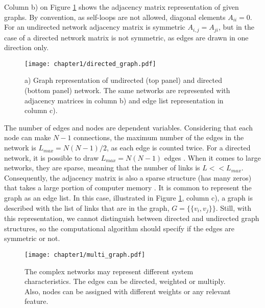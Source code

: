 Column b) on Figure \ref{fig:graph_dir} shows the adjacency matrix representation of given graphs. By convention, as self-loops are not allowed, diagonal elements $A_{ii}=0$. For an undirected network adjacency matrix is symmetric $A_{i,j}=A_{ji}$, but in the case of a directed network matrix is not symmetric, as edges are drawn in one direction only.  

\begin{figure}[h]
	\centering
	\texttt{[image: chapter1/directed\_graph.pdf]} 
	\caption[Graph, matrix and edge list representations.]{a) Graph representation of undirected (top panel) and directed (bottom panel) network. The same networks are represented with adjacency matrices in column b) and edge list representation in column c).}
	\label{fig:graph_dir}
\end{figure}

The number of edges and nodes are dependent variables. Considering that each node can make $N-1$ connections, the maximum number of the edges in the network is $L_{max}=N(N-1)/2$, as each edge is counted twice. For a directed network, it is possible to draw $L_{max}=N(N-1)$ edges \cite{caldarelli2007scalefree}. When it comes to large networks, they are sparse, meaning that the number of links is $L<<L_{max}$. Consequently, the adjacency matrix is also a sparse structure (has many zeros) that takes a large portion of computer memory \cite{barabasi2016network}. 
It is common to represent the graph as an edge list. In this case, illustrated in Figure \ref{fig:graph_dir}, column c), a graph is described with the list of links that are in the graph, $G = \{ \{v_i,v_j\}\}$. Still, with this representation, we cannot distinguish between directed and undirected graph structures, so the computational algorithm should specify if the edges are symmetric or not.  


\begin{figure}[h]
	\centering
	\texttt{[image: chapter1/multi\_graph.pdf]} 
	\caption[Different network representations.]{The complex networks may represent different system characteristics. The edges can be directed, weighted or multiply. Also, nodes can be assigned with different weights or any relevant feature.}
	\label{fig:multigraph}
\end{figure}

